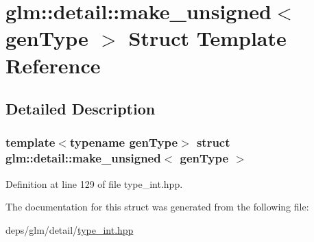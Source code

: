 \hypertarget{structglm_1_1detail_1_1make__unsigned}{}\section{glm\+:\+:detail\+:\+:make\+\_\+unsigned$<$ gen\+Type $>$ Struct Template Reference}
\label{structglm_1_1detail_1_1make__unsigned}


\subsection{Detailed Description}
\subsubsection*{template$<$typename gen\+Type$>$\newline
struct glm\+::detail\+::make\+\_\+unsigned$<$ gen\+Type $>$}



Definition at line 129 of file type\+\_\+int.\+hpp.



The documentation for this struct was generated from the following file\+:\begin{DoxyCompactItemize}
\item 
deps/glm/detail/\hyperlink{type__int_8hpp}{type\+\_\+int.\+hpp}\end{DoxyCompactItemize}
